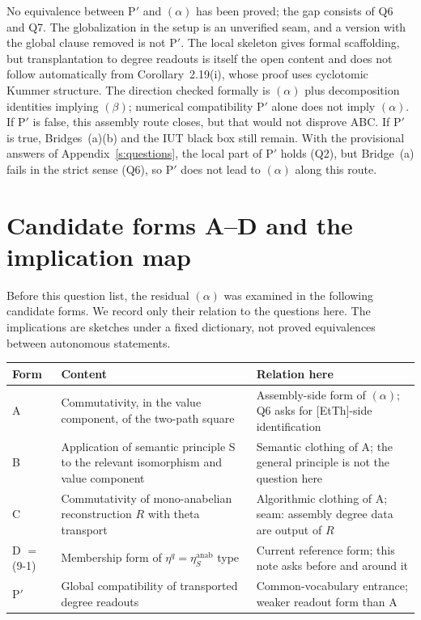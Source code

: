 \documentclass[11pt]{article}
\theoremstyle{definition}
\begin{document}
No equivalence between P$'$ and $(\alpha)$ has been proved; the
gap consists of Q6 and Q7.  The globalization in the setup is an
unverified seam, and a version with the global clause removed is
not P$'$.  The local skeleton gives formal scaffolding, but
transplantation to degree readouts is itself the open content
and does not follow automatically from Corollary~2.19(i), whose
proof uses cyclotomic Kummer structure.  The direction checked
formally is $(\alpha)$ plus decomposition identities implying
$(\beta)$; numerical compatibility P$'$ alone does not imply
$(\alpha)$.  If P$'$ is false, this assembly route closes, but
that would not disprove ABC.  If P$'$ is true, Bridges~(a)(b)
and the IUT black box still remain.  With the provisional answers of
Appendix~\ref{s:questions}, the local part of P$'$ holds (Q2), but
Bridge~(a) fails in the strict sense (Q6), so P$'$ does not lead to
$(\alpha)$ along this route.

\section{Candidate forms A--D and the implication map}\label{s:forms}

Before this question list, the residual $(\alpha)$ was examined
in the following candidate forms.  We record only their relation
to the questions here.  The implications are sketches under a
fixed dictionary, not proved equivalences between autonomous
statements.

\begin{center}
\small
\begin{tabular}{@{}p{}p{}p{}@{}}
\toprule
Form & Content & Relation here\\
\midrule
A & Commutativity, in the value component, of the two-path square & Assembly-side form of $(\alpha)$; Q6 asks for [EtTh]-side identification\\
B & Application of semantic principle S to the relevant isomorphism and value component & Semantic clothing of A; the general principle is not the question here\\
C & Commutativity of mono-anabelian reconstruction $R$ with theta transport & Algorithmic clothing of A; seam: assembly degree data are output of $R$\\
D $=$ (9-1) & Membership form of $\eta^q=\eta^{\mathrm{anab}}_S$ type & Current reference form; this note asks before and around it\\
P$'$ & Global compatibility of transported degree readouts & Common-vocabulary entrance; weaker readout form than A\\
\bottomrule
\end{tabular}
\end{center}
\end{document}
